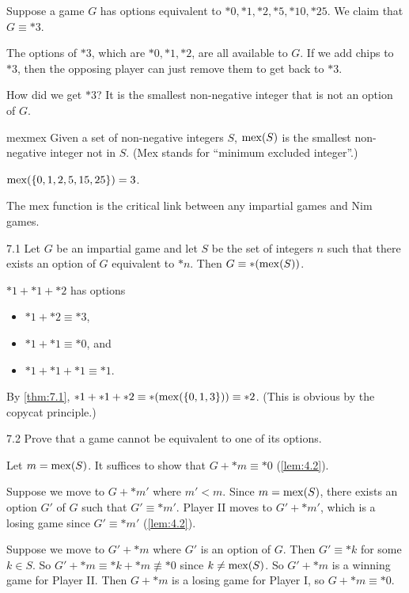 \documentclass[12pt,letterpaper]{report}
\begin{document}
Suppose a game $G$ has options equivalent to $*0, *1, *2, *5, *10, *25$.
We claim that $G \equiv *3$.

The options of $*3$, which are $*0, *1, *2$, are all available to $G$.
If we add chips to $*3$, then the opposing player can just remove them to get back to $*3$.

How did we get $*3$?
It is the smallest non-negative integer that is not an option of $G$.

\begin{defn}{mex}{mex}
  Given a set of non-negative integers $S$, $\operatorname*{mex}(S)$ is the smallest non-negative integer not in
  $S$.
  (Mex stands for ``minimum excluded integer''.)
\end{defn}

\begin{ex}
  $\operatorname*{mex}(\{0, 1, 2, 5, 15, 25\}) = 3$.
\end{ex}

The mex function is the critical link between any impartial games and Nim games.

\begin{thm}{}{7.1}
  Let $G$ be an impartial game and let $S$ be the set of integers $n$ such that there exists an
  option of $G$ equivalent to $*n$.
  Then $G \equiv *(\operatorname*{mex}(S))$.
\end{thm}

\begin{ex}
  $*1 + *1 + *2$ has options
  \begin{itemize}
    \item $*1 + *2 \equiv *3$,
    \item $*1 + *1 \equiv *0$, and
    \item $*1 + *1 + *1 \equiv *1$.
  \end{itemize}
  By \cref{thm:7.1}, $*1 + *1 + *2 \equiv *(\operatorname*{mex}(\{0, 1, 3\})) \equiv *2$.
  (This is obvious by the copycat principle.)
\end{ex}

\begin{exer}{}{7.2}
  Prove that a game cannot be equivalent to one of its options.
\end{exer}

\begin{thmproof}
  Let $m = \operatorname*{mex}(S)$.
  It suffices to show that $G + *m \equiv *0$ (\cref{lem:4.2}).
  \begin{enumcase}
    \item
      Suppose we move to $G + *m'$ where $m' < m$.
      Since $m = \operatorname*{mex}(S)$, there exists an option $G'$ of $G$ such that $G' \equiv *m'$.
      Player II moves to $G' + *m'$, which is a losing game since $G' \equiv *m'$ (\cref{lem:4.2}).
    \item
      Suppose we move to $G' + *m$ where $G'$ is an option of $G$.
      Then $G' \equiv *k$ for some $k \in S$.
      So $G' + *m \equiv *k + *m \not\equiv *0$ since $k \neq \operatorname*{mex}(S)$.
      So $G' + *m$ is a winning game for Player II.
      Then $G + *m$ is a losing game for Player I, so $G + *m \equiv *0$.
  \end{enumcase}
\end{thmproof}
\end{document}
